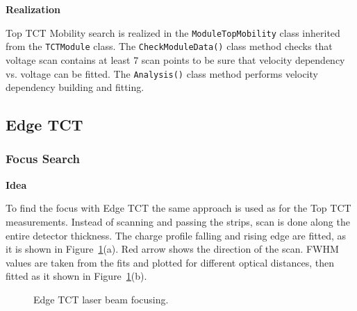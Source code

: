 \documentclass[12pt,oneside,notitlepage,abstracton,a4paper]{scrartcl}
\begin{document}
\textbf{Realization}

\indent Top TCT Mobility search is realized in the \lstinline$ModuleTopMobility$ class inherited from the \lstinline$TCTModule$ class. The \lstinline$CheckModuleData()$ class method checks that voltage scan contains at least 7 scan points to be sure that velocity dependency vs. voltage can be fitted. The \lstinline$Analysis()$ class method performs velocity dependency building and fitting.

\subsection{Edge TCT}\label{modules:edge}
\subsubsection{Focus Search}\label{modules:edge:focus}

\textbf{Idea}

To find the focus with Edge TCT the same approach is used as for the Top TCT measurements. Instead of scanning and passing the strips, scan is done along the entire detector thickness. The charge profile falling and rising edge are fitted, as it is shown in Figure~\ref{fig:edge_focus}(a). Red arrow shows the direction of the scan. FWHM values are taken from the fits and plotted for different optical distances, then fitted as it shown in Figure~\ref{fig:edge_focus}(b).

\begin{figure}[H]
    \centering
    \qquad
    \caption{Edge TCT laser beam focusing.}
    \label{fig:edge_focus}
\end{figure}
\end{document}
